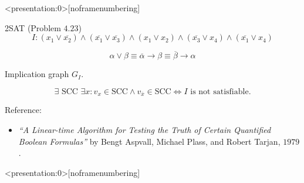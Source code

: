
\begin{frame}<presentation:0>[noframenumbering]
  \begin{exampleblock}{2SAT (Problem $4.23$)}
    \[
      I: (x_1 \lor \overline{x_2}) \land (\overline{x_1} \lor \overline{x_3}) \land (x_1 \lor x_2) \land (\overline{x_3} \lor x_4) \land (\overline{x_1} \lor x_4)
    \]
  \end{exampleblock}

  \pause
  \[
    \alpha \lor \beta \equiv \overline{\alpha} \to \beta \equiv \overline{\beta} \to \alpha
  \]

  \pause
  \begin{center}
    Implication graph $G_I$.
  \end{center}

  \pause
  \begin{theorem}[2SAT]
    \[
      \exists \text{ SCC } \exists x: v_x \in \text{SCC} \land v_{\overline{x}} \in \text{SCC} \iff I \text{ is not satisfiable}.
    \]
  \end{theorem}

  \pause
  \begin{alertblock}{Reference:}
    \begin{itemize}
      \item {\it ``A Linear-time Algorithm for Testing the Truth of Certain Quantified Boolean Formulas''} 
	by Bengt Aspvall, Michael Plass, and Robert Tarjan, $1979$.
    \end{itemize}
  \end{alertblock}
\end{frame}

\begin{frame}<presentation:0>[noframenumbering]
  \begin{columns}
      \pause
  \end{columns}
\end{frame}
